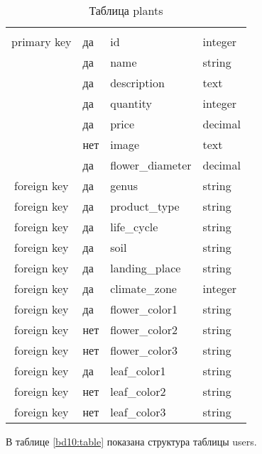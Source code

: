 \begin{xltabular}{\textwidth}{|c|X|X|X|}
	\caption{Таблица plants\label{bd9:table}}\\ \hline
	 &  & 
	&  \\ \hline
	\endfirsthead
	 &  & 
	&  \\ \hline
	\finishhead
	primary key & да & id & integer \\ \hline
	~ & да & name & string \\ \hline
	~ & да & description & text \\ \hline
	~ & да & quantity & integer \\ \hline
	~ & да & price & decimal \\ \hline
	~ & нет & image & text \\ \hline
	~ & да & flower\_diameter & decimal \\ \hline
	foreign key & да & genus & string \\ \hline
	foreign key & да & product\_type & string \\ \hline
	foreign key & да & life\_cycle & string \\ \hline
	foreign key & да & soil & string \\ \hline
	foreign key & да & landing\_place & string \\ \hline
	foreign key & да & climate\_zone & integer \\ \hline
	foreign key & да & flower\_color1 & string \\ \hline
	foreign key & нет & flower\_color2 & string \\ \hline
	foreign key & нет & flower\_color3 & string \\ \hline
	foreign key & да & leaf\_color1 & string \\ \hline
	foreign key & нет & leaf\_color2 & string \\ \hline
	foreign key & нет & leaf\_color3 & string
\end{xltabular}

В таблице \ref{bd10:table} показана структура таблицы users.

